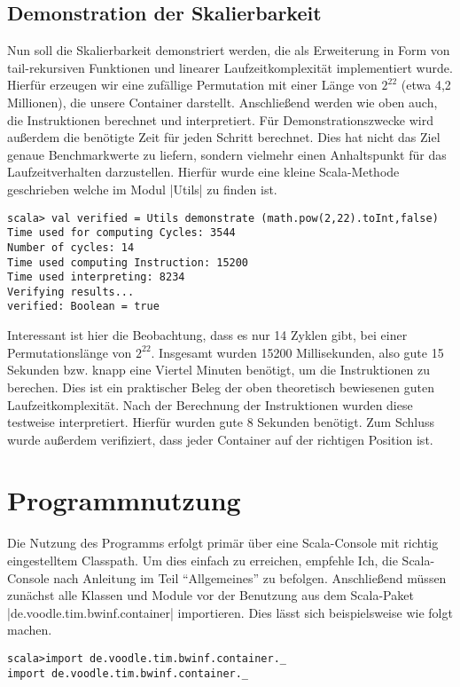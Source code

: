 \subsection{Demonstration der Skalierbarkeit}
\label{scalability}
Nun soll die Skalierbarkeit demonstriert werden,
die als Erweiterung in Form von tail-rekursiven Funktionen und linearer Laufzeitkomplexität implementiert wurde.\\
Hierfür erzeugen wir eine zufällige Permutation mit einer Länge von $2^22$ (etwa 4,2 Millionen), die unsere Container darstellt.
Anschließend werden wie oben auch, die Instruktionen berechnet und interpretiert.
Für Demonstrationszwecke wird außerdem die benötigte Zeit für jeden Schritt berechnet.
Dies hat nicht das Ziel genaue Benchmarkwerte zu liefern, sondern vielmehr einen Anhaltspunkt für das Laufzeitverhalten darzustellen.
Hierfür wurde eine kleine Scala-Methode geschrieben welche im Modul |Utils| zu finden ist.
\begin{lstlisting}
scala> val verified = Utils demonstrate (math.pow(2,22).toInt,false)
Time used for computing Cycles: 3544
Number of cycles: 14
Time used computing Instruction: 15200
Time used interpreting: 8234
Verifying results...
verified: Boolean = true
\end{lstlisting}
\lstset{basicstyle=\ttfamily}
Interessant ist hier die Beobachtung, dass es nur 14 Zyklen gibt, bei einer Permutationslänge von $2^22$.
Insgesamt wurden 15200 Millisekunden, also gute 15 Sekunden bzw. knapp eine Viertel Minuten benötigt, um die Instruktionen zu berechen.
Dies ist ein praktischer Beleg der oben theoretisch bewiesenen guten Laufzeitkomplexität.
Nach der Berechnung der Instruktionen wurden diese testweise interpretiert. Hierfür wurden gute 8 Sekunden benötigt.
Zum Schluss wurde außerdem verifiziert, dass jeder Container auf der richtigen Position ist.
\section{Programmnutzung}
\lstset{basicstyle=\ttfamily}
Die Nutzung des Programms erfolgt primär über eine Scala-Console mit richtig eingestelltem Classpath.
Um dies einfach zu erreichen, empfehle Ich, die Scala-Console nach Anleitung im Teil ``Allgemeines'' zu befolgen.
Anschließend müssen zunächst alle Klassen und Module vor der Benutzung aus dem Scala-Paket |de.voodle.tim.bwinf.container| importieren. Dies lässt sich beispielsweise wie folgt machen.
\begin{lstlisting}
scala>import de.voodle.tim.bwinf.container._
import de.voodle.tim.bwinf.container._
\end{lstlisting}
